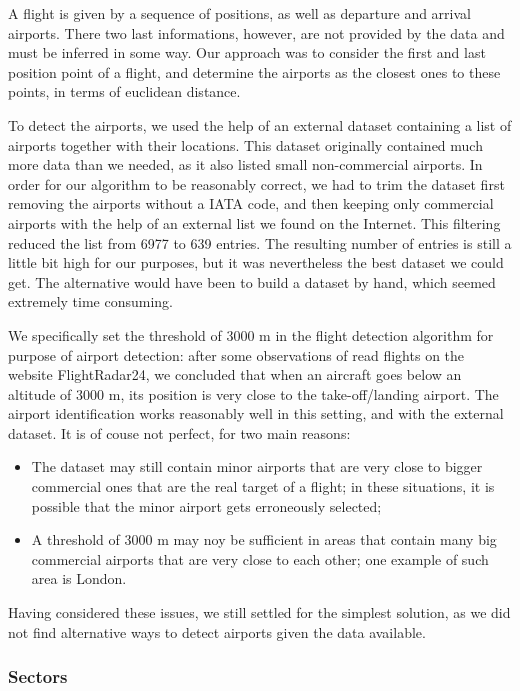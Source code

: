 \documentclass{vldb}
\begin{document}
A flight is given by a sequence of positions, as well as departure and arrival
airports. There two last informations, however, are not provided by the data and
must be inferred in some way. Our approach was to consider the first and last
position point of a flight, and determine the airports as the closest ones to
these points, in terms of euclidean distance.

To detect the airports, we used the help of an external dataset containing a
list of airports together with their locations. This dataset originally
contained much more data than we needed, as it also listed small non-commercial
airports. In order for our algorithm to be reasonably correct, we had to trim
the dataset first removing the airports without a IATA code, and then keeping
only commercial airports with the help of an external list we found on the
Internet. This filtering reduced the list from 6977 to 639 entries.
The resulting number of entries is still a little bit high for our purposes, but
it was nevertheless the best dataset we could get. The alternative would have
been to build a dataset by hand, which seemed extremely time consuming.

We specifically set the threshold of 3000 m in the flight detection algorithm
for purpose of airport detection: after some observations of read flights on the
website FlightRadar24, we concluded that when an aircraft goes below an altitude
of 3000 m, its position is very close to the take-off/landing airport. The
airport identification works reasonably well in this setting, and with the
external dataset. It is of couse not perfect, for two main reasons:

\begin{itemize}
  \item The dataset may still contain minor airports that are very close to
  bigger commercial ones that are the real target of a flight; in these
  situations, it is possible that the minor airport gets erroneously selected;
  \item A threshold of 3000 m may noy be sufficient in areas that contain many
  big commercial airports that are very close to each other; one example of such
  area is London.
\end{itemize}

Having considered these issues, we still settled for the simplest solution, as
we did not find alternative ways to detect airports given the data available.

\subsubsection{Sectors}
\end{document}
